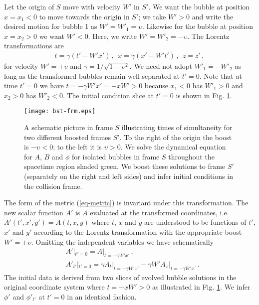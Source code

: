 \documentclass[preprintnumbers,eqsecnum,aps,prd,epsf,showpacs,nofootinbib
]{revtex4}
\newcommand{\up}{\upsilon }
\begin{document}
Let the origin of $S$ move with velocity $W'$ in $S'$. We want the
bubble at position $x=x_1<0$ to move towards the origin in $S'$; we
take $W' > 0$ and write the desired motion for bubble 1 as $W' = W'_1
= \upsilon$.  Likewise for the bubble at position $x=x_2>0$ we want
$W' < 0$. Here, we write $W' = W'_2 = -\upsilon$.  The Lorentz
transformations are
\begin{align}
t=\gamma (t'-W' x')\,,~~x=\gamma (x'-W' t')\,,~~z=z'\,,
\label{eq-Lorentz}
\end{align}
for velocity $W'=\pm \upsilon$ and $\gamma=1/\sqrt{1-\upsilon^2}$.  We
need not adopt $W'_1 = -W'_2$ as long as the transformed bubbles
remain well-separated at $t'=0$.  Note that at time $t'=0$ we have
$t=-\gamma W' x' = -x W' > 0$ because $x_1<0$ has $W'_1>0$ and $x_2>0$
has $W'_2< 0$. The initial condition slice at $t'=0$ is shown in
Fig. \ref{fig-collide}.

\begin{figure}[htbp]
\begin{center}
\texttt{[image: bst-frm.eps]} 
\end{center}
\caption{A schematic picture in frame $S$ illustrating times of
  simultaneity for two different boosted frames $S'$.  To the right of
  the origin the boost is $-\up<0$; to the left it is $\up > 0$.  We
  solve the dynamical equation for $A$, $B$ and $\phi$ for isolated
  bubbles in frame $S$ throughout the spacetime region shaded
  green. We boost these solutions to frame $S'$ (separately on the
  right and left sides) and infer initial conditions in the collision
  frame.}
\label{fig-collide}
\end{figure}

The form of the metric (\ref{eq-metric}) is invariant under this
transformation. The new scalar function $A'$ is $A$ evaluated at the
transformed coordinates, i.e. $A'(t',x',y')=A(t,x,y)$ where $t$, $x$
and $y$ are understood to be functions of $t'$, $x'$ and $y'$
according to the Lorentz transformation with the appropriate boost
$W'=\pm \upsilon$.  Omitting the independent variables we have
schematically
\begin{align}
&A'|_{t'=0}=A |_{t=-\gamma W' x'}\,,\\
&A'_{t'}|_{t'=0}= \gamma A_t |_{t=-\gamma W' x'}-\gamma W' A_x |_{t=-\gamma W' x'} \,.
\end{align}
The initial data is derived from two slices of evolved bubble solutions in the
original coordinate system where $t=-x W' > 0$ as illustrated in
Fig. \ref{fig-collide}. We infer $\phi'$ and $\phi'_{t'}$ at $t'=0$ in an
identical fashion.
\end{document}
